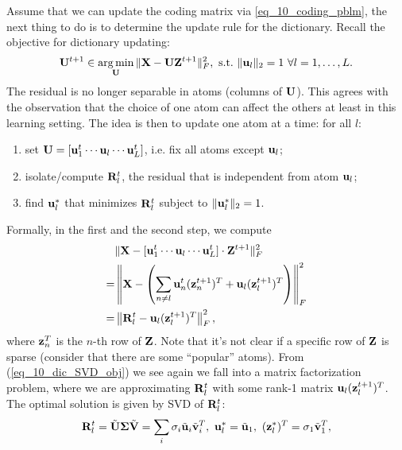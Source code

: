 \documentclass[../main.tex]{subfiles}
\begin{document}
\par Assume that we can update the coding matrix via \ref{eq_10_coding_pblm}, the next thing to do is to determine the update rule for the dictionary. Recall the objective for dictionary updating:
\begin{equation*}
{\bf U}^{t+1}\in \mathop{\arg\min}_{\bf U} \|{\bf X}-{\bf U}{\bf Z}^{t+1}\|_F^2,\ {\rm s.t. }\ \|{\bf u}_l\|_2=1\ \forall l=1,\dots,L.
\end{equation*}
The residual is no longer separable in atoms (columns of ${\bf U}$). This agrees with the observation that the choice of one atom can affect the others at least in this learning setting. The idea is then to update one atom at a time: for all $l$:
\begin{enumerate}
	\item set ${\bf U}=[{\bf u}_1^t\cdots {\bf u}_l\cdots {\bf u}_L^t]$, i.e. fix all atoms except ${\bf u}_l$;
	\item isolate/compute ${\bf R}_l^t$, the residual that is independent from atom ${\bf u}_l$;
	\item find ${\bf u}_l^*$ that minimizes ${\bf R}_l^t$ subject to $\|{\bf u}_l^*\|_2=1$.
\end{enumerate}
Formally, in the first and the second step, we compute
\begin{align}
&\|{\bf X}-[{\bf u}_1^t\cdots {\bf u}_l\cdots {\bf u}_L^t]\cdot {\bf Z}^{t+1}\|_F^2\notag\\
=&\left\|{\bf X}-\left(\sum_{n\neq l}{\bf u}_n^t({\bf z}_n^{t+1})^T + {\bf u}_l({\bf z}_l^{t+1})^T\right)\right\|_F^2\notag\\
\label{eq_10_dic_SVD_obj}=&\left\|{\bf R}_l^t-{\bf u}_l({\bf z}_l^{t+1})^T\right\|_F^2,
\end{align}
where ${\bf z}_n^T$ is the $n$-th row of ${\bf Z}$. Note that it's not clear if a specific row of ${\bf Z}$ is sparse (consider that there are some ``popular'' atoms). From (\ref{eq_10_dic_SVD_obj}) we see again we fall into a matrix factorization problem, where we are approximating ${\bf R}_l^t$ with some rank-1 matrix ${\bf u}_l ({\bf z}_l^{t+1})^T$. The optimal solution is given by SVD of ${\bf R}_l^t$:
\begin{equation*}
{\bf R}_l^t=\tilde{\bf U}{\bf \Sigma}\tilde{\bf V}=\sum_i \sigma_i \tilde{\bf u}_i\tilde{\bf v}_i^T,\ {\bf u}_l^*=\tilde{\bf u}_1,\ ({\bf z}_l^{*})^T = \sigma_1\tilde{\bf v}_1^T,
\end{equation*}
\end{document}
